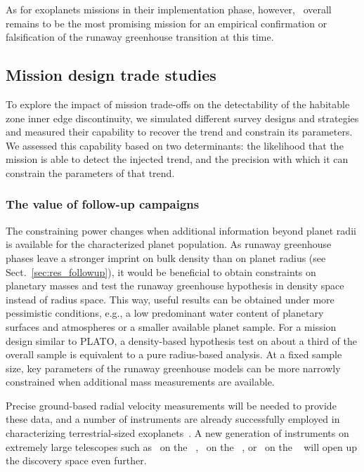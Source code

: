\documentclass[twocolumn,twocolappendix]{aastex631}
\begin{document}
As for exoplanets missions in their implementation phase, however, \plato\ overall remains to be the most promising mission for an empirical confirmation or falsification of the runaway greenhouse transition at this time.


\subsection{Mission design trade studies}\label{sec:mission-design-trades}
To explore the impact of mission trade-offs on the detectability of the habitable zone inner edge discontinuity, we simulated different survey designs and strategies and measured their capability to recover the trend and constrain its parameters.
We assessed this capability based on two determinants: the likelihood that the mission is able to detect the injected trend, and the precision with which it can constrain the parameters of that trend.

\subsubsection{The value of follow-up campaigns}
The constraining power changes when additional information beyond planet radii is available for the characterized planet population.
As runaway greenhouse phases leave a stronger imprint on bulk density than on planet radius (see Sect.~\ref{sec:res_followup}), it would be beneficial to obtain constraints on planetary masses and test the runaway greenhouse hypothesis in density space instead of radius space.
This way, useful results can be obtained under more pessimistic conditions, e.g., a low predominant water content of planetary surfaces and atmospheres or a smaller available planet sample.
For a mission design similar to PLATO, a density-based hypothesis test on about a third of the overall sample is equivalent to a pure radius-based analysis.
At a fixed sample size, key parameters of the runaway greenhouse models can be more narrowly constrained when additional mass measurements are available.

Precise ground-based radial velocity measurements will be needed to provide these data, and a number of instruments are already successfully employed in characterizing terrestrial-sized exoplanets~\citep[e.g.,][]{Queloz2001a,Pepe2010,Johnson2010b,Ribas2023}.
A new generation of instruments on extremely large telescopes such as \gclef\ on the \gmt ~\citep{Szentgyorgyi2016}, \andes\ on the \elt ~\citep{Marcantonio2022}, or \modhis\ on the \tmt ~\citep{Mawet2019} will open up the discovery space even further.
\end{document}
